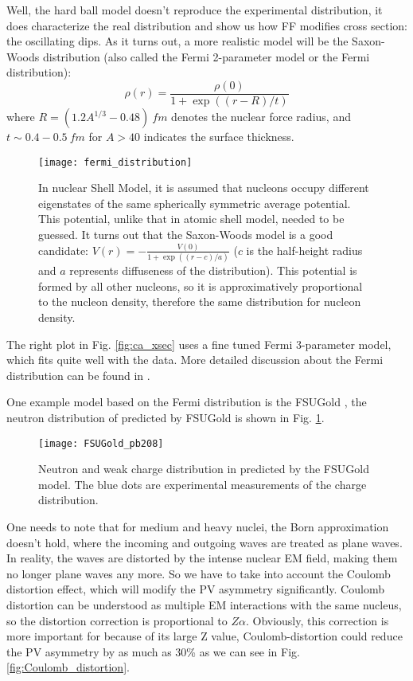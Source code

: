 Well, the hard ball model doesn't reproduce the experimental distribution, it does
characterize the real distribution and show us how FF modifies cross section:
the oscillating dips. As it turns out, a more realistic model will be the
Saxon-Woods distribution (also called the Fermi 2-parameter model or the Fermi
distribution):
\begin{equation}
    \rho(r) = \frac{\rho(0)}{1 + \exp((r-R)/t)}
\end{equation}
where $R = (1.2A^{1/3} - 0.48) \ fm$ denotes the nuclear force radius, 
and $t \sim 0.4-0.5 \ fm$ for  $A > 40$ indicates the surface thickness.
\begin{figure}
    \centering
    \texttt{[image: fermi\_distribution]}
    \caption{In nuclear Shell Model, it is assumed that nucleons occupy 
    different eigenstates of the same spherically symmetric average potential.
    This potential, unlike that in atomic shell model, needed to be guessed. 
    It turns out that the Saxon-Woods model is a good candidate: 
    $V(r) = -\frac{V(0)}{1+\exp((r-c)/a)}$ ($c$ is the half-height radius and $a$ represents
    diffuseness of the distribution). This potential is formed
    by all other nucleons, so it is approximatively proportional to the nucleon density, 
    therefore the same distribution for nucleon density.} 
\end{figure}

The right plot in Fig. \ref{fig:ca_xsec} uses a fine tuned Fermi 3-parameter model,
which fits quite well with the data. More detailed discussion about the Fermi 
distribution can be found in \cite{Maximon:1966sqn}.

One example model based on the Fermi distribution is the FSUGold \cite{PhysRevLett.95.122501},
the neutron distribution of \Pb predicted by FSUGold is shown in Fig. \ref{fig:FSUGold_pb208}.
\begin{figure}
    \centering
    \texttt{[image: FSUGold\_pb208]}
    \caption{Neutron and weak charge distribution in \Pb predicted by the FSUGold model.
    The blue dots are experimental measurements of the charge distribution.}
    \label{fig:FSUGold_pb208}
\end{figure}

One needs to note that for medium and heavy nuclei, the Born approximation
doesn't hold, where the incoming and outgoing waves are treated as plane waves.
In reality, the waves are distorted by the intense nuclear EM field, making them
no longer plane waves any more. So we have to take into account the 
Coulomb distortion effect, which will modify the PV asymmetry significantly.
Coulomb distortion can be understood as multiple EM interactions with
the same nucleus, so the distortion correction is proportional to $Z\alpha$. 
Obviously, this correction is more important for \Pb because of its large Z value,
Coulomb-distortion could reduce the PV asymmetry by as much as 30\% as we can see
in Fig. \ref{fig:Coulomb_distortion}.

